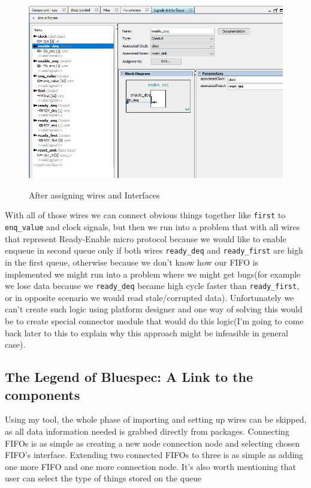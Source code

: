 \documentclass[12pt]{report}
\begin{document}
\begin{figure}[H]
    \caption{After assigning wires and Interfaces}
    \includegraphics[width=\textwidth]{images/Example1AfterOrganization.png} \\
    \centering
\end{figure}

With all of those wires we can connect obvious things together like \verb!first! to \verb!enq_value! and clock signals, but then we run into a problem that with all wires that represent Ready-Enable micro protocol because we would like to enable enqueue in second queue only if both wires \verb!ready_deq! and \verb!ready_first! are high in the first queue, otherwise because we don't know how our FIFO is implemented we might run into a problem where we might get bugs(for example we lose data because we \verb!ready_deq! became high cycle faster than \verb!ready_first!, or in opposite scenario we would read stale/corrupted data). Unfortunately we can't create such logic using platform designer and one way of solving this would be to create special connector module that would do this logic(I'm going to come back later to this to explain why this approach might be infeasible in general case). 
\subsection{The Legend of Bluespec: A Link to the components}
Using my tool, the whole phase of importing and setting up wires can be skipped, as all data information needed is grabbed directly from packages. Connecting FIFOs is as simple as creating a new node connection node and selecting chosen FIFO's interface. Extending two connected FIFOs to three is as simple as adding one more FIFO and one more connection node. It's also worth mentioning that user can select the type of things stored on the queue
\end{document}
